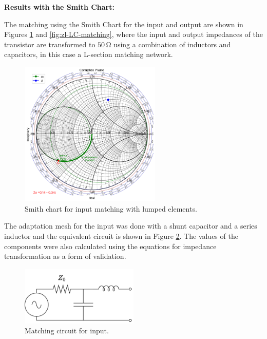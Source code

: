 \vspace{0.4cm}
\textbf{Results with the Smith Chart:}
\vspace{0.4cm}

The matching using the Smith Chart for the input and output are shown in Figures \ref{fig:zs-LC-matching} and \ref{fig:zl-LC-matching}, where the input and output impedances of the transistor are transformed to $50\,\si{\ohm}$ using a combination of inductors and capacitors, in this case a L-section matching network.

\begin{figure}[H]
    \centering
    \includegraphics[width=0.6\textwidth]{Images/zs-lc-match.png}
    \caption{Smith chart for input matching with lumped elements.}
    \label{fig:zs-LC-matching}
\end{figure}

The adaptation mesh for the input was done with a shunt capacitor and a series inductor and the equivalent circuit is shown in Figure \ref{fig:MatchingCircuit-input}. The values of the components were also calculated using the equations for impedance transformation as a form of validation.

\begin{figure}[H]
    \centering
    \includegraphics[width=0.5\textwidth]{Images/Input-matching-circuit.png}
    \caption{Matching circuit for input.}
    \label{fig:MatchingCircuit-input}
\end{figure}

